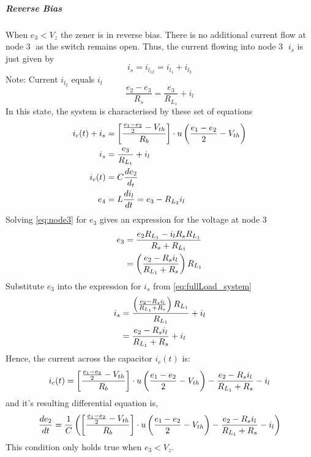 \subparagraph{Reverse Bias}
When $e_3 < V_z$ the zener is in reverse bias. There is no additional current flow at node \textcircled{3} as the switch remains open. Thus, the current flowing into node \textcircled{3} $i_s$ is just given by $$i_s = i_{l_{12}} = i_{l_1} + i_{l_2}$$
Note: Current $i_{l_2}$ equals $i_l$
\begin{equation}
	\frac{e_2 - e_3}{R_s} = \frac{e_3}{R_{L_1}} + i_l
	\label{eq:node3}
\end{equation}
In this state, the system is characterised by these set of equations
\begin{align}
	i_c(t) + i_s &= \left[\frac{\frac{e_1 - e_2}{2} - V_{th}}{R_b} \right]\cdot u\left(\frac{e_1 - e_2}{2} - V_{th} \right) \\
	i_s &= \frac{e_3}{R_{L_1}} + i_l \\
	i_c(t) &= C \frac{de_2}{d_t} \\
	e_4 &= L\frac{di_l}{dt} = e_3 - R_{L_2}i_l
	\label{eq:fullLoad_system}
\end{align}
Solving \eqref{eq:node3} for $e_3$ gives an expression for the voltage at node \textcircled{3}
\begin{equation}
\begin{split}
	e_3 &= \frac{e_2R_{L_1} - i_l R_s R_{L_1}}{R_s + R_{L_1}} \\
	    &= \left(\frac{e_2 - R_s i_l}{R_{L_1} + R_s} \right)R_{L_1}
\end{split}
\label{eq:e3_il}
\end{equation}
Substitute $e_3$ into the expression for $i_s$ from \eqref{eq:fullLoad_system}
\begin{equation}
 \begin{split}
	i_s &= \frac{\left(\frac{e_2 - R_s i_l}{R_{L_1} + R_s} \right)R_{L_1}}{R_{L_1}} + i_l \\
		&= \frac{e_2 - R_s i_l}{R_{L_1} + R_s} + i_l
 \end{split}
\end{equation}
Hence, the current across the capacitor $i_c(t)$ is:
\begin{equation}
	i_c(t) = \left[\frac{\frac{e_1 - e_2}{2} - V_{th}}{R_b} \right]\cdot u\left(\frac{e_1 - e_2}{2} - V_{th} \right) - \frac{e_2 - R_s i_l}{R_{L_1} + R_s} - i_l
\end{equation}
and it's resulting differential equation is,
\begin{equation}
	\frac{de_2}{dt} = \frac{1}{C}\left(\left[\frac{\frac{e_1 - e_2}{2} - V_{th}}{R_b} \right]\cdot u\left(\frac{e_1 - e_2}{2} - V_{th} \right) - \frac{e_2 - R_s i_l}{R_{L_1} + R_s} - i_l \right)
	\label{eq:fullLoad_DiffEq1}
\end{equation}
This condition only holds true when $e_3 < V_z$.

